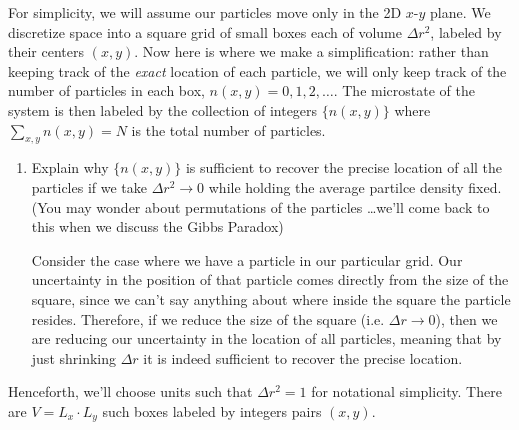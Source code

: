 \documentclass[10pt]{article}
\begin{document}
	For simplicity, we will assume our particles move only in the 2D $x$-$y$ plane. We discretize space 
	into a square grid of small boxes each of volume $\Delta r^2$, labeled by their centers $(x, y)$. Now
	here is where we make a simplification: rather than keeping track of the \textit{exact} location of each 
	particle, we will only keep track of the number of particles in each box, $n(x, y) = 0, 1, 2, \dots$. 
	The microstate of the system is then labeled by the collection of integers $\{n(x, y)\}$ where 
	$\sum_{x,y} n(x, y) = N$ is the total number of particles. 
	\begin{enumerate}[label=\alph*)]
		\item Explain why $\{n(x, y)\}$ is sufficient to recover the precise location of all the particles if we 
			take $\Delta r^2 \to 0$ while holding the average partilce density fixed. (You may wonder about 
			permutations of the particles \ldots we'll come back to this when we discuss the Gibbs Paradox)

			\begin{solution}
				Consider the case where we have a particle in our particular grid. Our uncertainty 
				in the position of that particle comes directly from the size of the square,  
				since we can't say anything about where inside the square the particle resides. Therefore, 
				if we reduce the size of the square (i.e. $\Delta r \to 0$), then we are reducing 
				our uncertainty in the location of all particles, meaning that by just shrinking $\Delta r$ 
				it is indeed sufficient to recover the precise location.
			\end{solution}
	\end{enumerate}
	Henceforth, we'll choose units such that $\Delta r^2 = 1$ for notational simplicity. There are $V = L_x \cdot
	L_y$ such boxes labeled by integers pairs $(x, y)$. 
\end{document}
